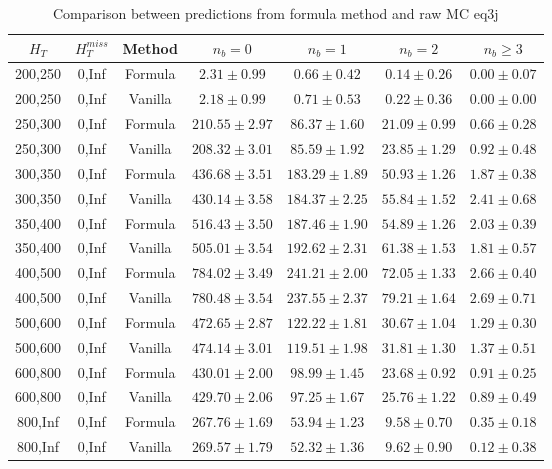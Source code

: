 
\begin{longtable}{ | c | c | c | c | c | c | c | }
\caption{Comparison between predictions from formula method and raw MC eq3j} \label{tab:formula-eq3j} \\    \hline 
$H_{T}$ & $H_{T}^{miss}$ & Method & $n_{b} = 0$ & $n_{b} = 1$ & $n_{b} = 2$ & $n_{b} \ge 3$ \\ \hline200,250 & 0,Inf & Formula  & $     2.31 \pm  0.99 $ & $     0.66 \pm  0.42 $ & $     0.14 \pm  0.26 $ & $     0.00 \pm  0.07 $  \\  
200,250 & 0,Inf & Vanilla  & $     2.18 \pm  0.99 $ & $     0.71 \pm  0.53 $ & $     0.22 \pm  0.36 $ & $     0.00 \pm  0.00 $  \\ \hline 
250,300 & 0,Inf & Formula  & $   210.55 \pm  2.97 $ & $    86.37 \pm  1.60 $ & $    21.09 \pm  0.99 $ & $     0.66 \pm  0.28 $  \\  
250,300 & 0,Inf & Vanilla  & $   208.32 \pm  3.01 $ & $    85.59 \pm  1.92 $ & $    23.85 \pm  1.29 $ & $     0.92 \pm  0.48 $  \\ \hline 
300,350 & 0,Inf & Formula  & $   436.68 \pm  3.51 $ & $   183.29 \pm  1.89 $ & $    50.93 \pm  1.26 $ & $     1.87 \pm  0.38 $  \\  
300,350 & 0,Inf & Vanilla  & $   430.14 \pm  3.58 $ & $   184.37 \pm  2.25 $ & $    55.84 \pm  1.52 $ & $     2.41 \pm  0.68 $  \\ \hline 
350,400 & 0,Inf & Formula  & $   516.43 \pm  3.50 $ & $   187.46 \pm  1.90 $ & $    54.89 \pm  1.26 $ & $     2.03 \pm  0.39 $  \\  
350,400 & 0,Inf & Vanilla  & $   505.01 \pm  3.54 $ & $   192.62 \pm  2.31 $ & $    61.38 \pm  1.53 $ & $     1.81 \pm  0.57 $  \\ \hline 
400,500 & 0,Inf & Formula  & $   784.02 \pm  3.49 $ & $   241.21 \pm  2.00 $ & $    72.05 \pm  1.33 $ & $     2.66 \pm  0.40 $  \\  
400,500 & 0,Inf & Vanilla  & $   780.48 \pm  3.54 $ & $   237.55 \pm  2.37 $ & $    79.21 \pm  1.64 $ & $     2.69 \pm  0.71 $  \\ \hline 
500,600 & 0,Inf & Formula  & $   472.65 \pm  2.87 $ & $   122.22 \pm  1.81 $ & $    30.67 \pm  1.04 $ & $     1.29 \pm  0.30 $  \\  
500,600 & 0,Inf & Vanilla  & $   474.14 \pm  3.01 $ & $   119.51 \pm  1.98 $ & $    31.81 \pm  1.30 $ & $     1.37 \pm  0.51 $  \\ \hline 
600,800 & 0,Inf & Formula  & $   430.01 \pm  2.00 $ & $    98.99 \pm  1.45 $ & $    23.68 \pm  0.92 $ & $     0.91 \pm  0.25 $  \\  
600,800 & 0,Inf & Vanilla  & $   429.70 \pm  2.06 $ & $    97.25 \pm  1.67 $ & $    25.76 \pm  1.22 $ & $     0.89 \pm  0.49 $  \\ \hline 
800,Inf & 0,Inf & Formula  & $   267.76 \pm  1.69 $ & $    53.94 \pm  1.23 $ & $     9.58 \pm  0.70 $ & $     0.35 \pm  0.18 $  \\  
800,Inf & 0,Inf & Vanilla  & $   269.57 \pm  1.79 $ & $    52.32 \pm  1.36 $ & $     9.62 \pm  0.90 $ & $     0.12 \pm  0.38 $  \\ \hline 
    \hline 
    \hline 
\end{longtable}